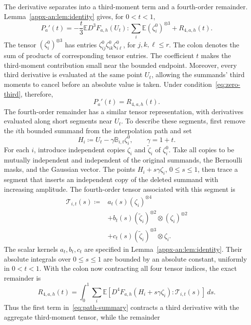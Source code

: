 \documentclass[11pt,letterpaper]{article}
\theoremstyle{remark}
\newcommand{\E}{\mathbb E}
\newcommand{\dd}{\,d}
\begin{document}
The derivative separates into a third-moment term and a fourth-order
remainder. Lemma~\ref{appx-an:lem:identity} gives, for \(0<t<1\),
\begin{equation}
 P_a'(t)=-\frac t3
       \E D^3F_{a,h}(U_t):\sum_i\E(\zeta_i^0)^{\otimes3}
       +R_{4,a,h}(t).
 \label{eq:path-summary}
\end{equation}
The tensor \((\zeta_i^0)^{\otimes3}\) has entries
\(\zeta_{ij}^0\zeta_{ik}^0\zeta_{i\ell}^0\), for \(j,k,\ell\le r\).
The colon denotes the sum of products of corresponding tensor entries. The coefficient \(t\) makes
the third-moment contribution small near the bounded endpoint.
Moreover, every third derivative is evaluated at the same point
\(U_t\), allowing the summands' third moments to cancel before an
absolute value is taken. Under condition~\eqref{eq:zero-third}, therefore,
\begin{equation}
 P_a'(t)=R_{4,a,h}(t).
 \label{zs:identity}
\end{equation}
The fourth-order remainder has a similar tensor representation, with
derivatives evaluated along short segments near \(U_t\). To describe
these segments, first remove the \(i\)th bounded summand from the
interpolation path and set
\[
 H_i\coloneqq U_t-\gamma\mathbb B_{i,t}\zeta_i^0,
 \qquad \gamma=1+t.
\]
For each \(i\), introduce independent copies \(\zeta_i\) and
\(\widetilde\zeta_i\) of \(\zeta_i^0\). Take all copies to be
mutually independent and independent of the original summands,
the Bernoulli masks, and the Gaussian vector. The points
\(H_i+s\gamma\zeta_i\), \(0\le s\le1\), then trace a segment that
inserts an independent copy of the deleted summand with increasing
amplitude. The fourth-order tensor associated with this segment is
\[
 \begin{aligned}
 \mathcal T_{i,t}(s)\coloneqq{}&a_t(s)(\zeta_i)^{\otimes4}\\
 &+b_t(s)(\widetilde\zeta_i)^{\otimes2}\otimes(\zeta_i)^{\otimes2}\\
 &+c_t(s)(\widetilde\zeta_i)^{\otimes3}\otimes\zeta_i.
 \end{aligned}
\]
The scalar kernels \(a_t,b_t,c_t\) are specified in
Lemma~\ref{appx-an:lem:identity}. Their absolute integrals over
\(0\le s\le1\) are bounded by an absolute constant, uniformly in
\(0<t<1\).
With the colon now contracting all four tensor indices, the exact
remainder is
\[
 R_{4,a,h}(t)=\int_0^1\sum_i\E\left[
 D^4F_{a,h}(H_i+s\gamma\zeta_i):\mathcal T_{i,t}(s)
 \right]\dd s.
\]
Thus the first term in~\eqref{eq:path-summary} contracts a third
derivative with the aggregate third-moment tensor, while the remainder
\end{document}
